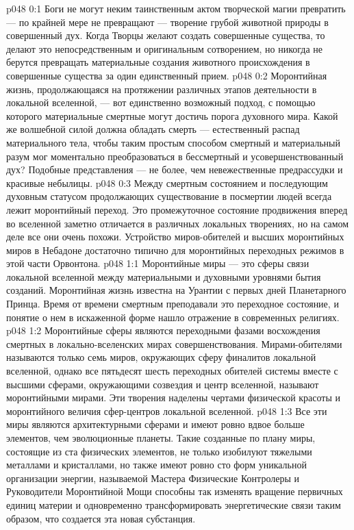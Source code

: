 \author{Архангел}
\vs p048 0:1 Боги не могут неким таинственным актом творческой магии превратить --- по крайней мере не превращают --- творение грубой животной природы в совершенный дух. Когда Творцы желают создать совершенные существа, то делают это непосредственным и оригинальным сотворением, но никогда не берутся превращать материальные создания животного происхождения в совершенные существа за один единственный прием.
\vs p048 0:2 Моронтийная жизнь, продолжающаяся на протяжении различных этапов деятельности в локальной вселенной, --- вот единственно возможный подход, с помощью которого материальные смертные могут достичь порога духовного мира. Какой же волшебной силой должна обладать смерть --- естественный распад материального тела, чтобы таким простым способом смертный и материальный разум мог моментально преобразоваться в бессмертный и усовершенствованный дух? Подобные представления --- не более, чем невежественные предрассудки и красивые небылицы.
\vs p048 0:3 Между смертным состоянием и последующим духовным статусом продолжающих существование в посмертии людей всегда лежит моронтийный переход. Это промежуточное состояние продвижения вперед во вселенной заметно отличается в различных локальных творениях, но на самом деле все они очень похожи. Устройство миров\hyp{}обителей и высших моронтийных миров в Небадоне достаточно типично для моронтийных переходных режимов в этой части Орвонтона.
\vs p048 1:1 Моронтийные миры --- это сферы связи локальной вселенной между материальными и духовными уровнями бытия созданий. Моронтийная жизнь известна на Урантии с первых дней Планетарного Принца. Время от времени смертным преподавали это переходное состояние, и понятие о нем в искаженной форме нашло отражение в современных религиях.
\vs p048 1:2 Моронтийные сферы являются переходными фазами восхождения смертных в локально\hyp{}вселенских мирах совершенствования. Мирами\hyp{}обителями называются только семь миров, окружающих сферу финалитов локальной вселенной, однако все пятьдесят шесть переходных обителей системы вместе с высшими сферами, окружающими созвездия и центр вселенной, называют моронтийными мирами. Эти творения наделены чертами физической красоты и моронтийного величия сфер\hyp{}центров локальной вселенной.
\vs p048 1:3 Все эти миры являются архитектурными сферами и имеют ровно вдвое больше элементов, чем эволюционные планеты. Такие созданные по плану миры, состоящие из ста физических элементов, не только изобилуют тяжелыми металлами и кристаллами, но также имеют ровно сто форм уникальной организации энергии, называемой  Мастера Физические Контролеры и Руководители Моронтийной Мощи способны так изменять вращение первичных единиц материи и одновременно трансформировать энергетические связи таким образом, что создается эта новая субстанция.
